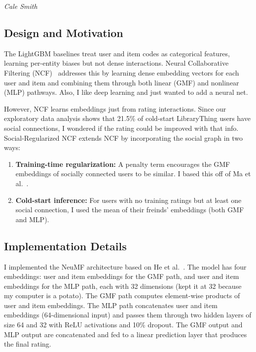 \documentclass[conference]{IEEEtran}
\begin{document}
\textit{Cale Smith}

\subsection{Design and Motivation}

The LightGBM baselines treat user and item codes as categorical features, 
learning per-entity biases but not dense interactions. Neural Collaborative 
Filtering (NCF)~\cite{he2017ncf} addresses this by learning dense embedding 
vectors for each user and item and combining them through both linear (GMF) and 
nonlinear (MLP) pathways. Also, I like deep learning and just wanted to add a
neural net.

However, NCF learns embeddings just from rating interactions. Since our 
exploratory data analysis shows that 21.5\% of cold-start LibraryThing users 
have social connections, I wondered if the rating could be improved with that 
info. Social-Regularized NCF extends NCF by incorporating the social graph in 
two ways:

\begin{enumerate}
  \item \textbf{Training-time regularization:} A penalty term encourages the GMF embeddings of socially connected users to be similar. I based this off of Ma et al.~\cite{ma2011soreg}.
  \item \textbf{Cold-start inference:} For users with no training ratings but at least one social connection, I used the mean of their freinds' embeddings (both GMF and MLP).
\end{enumerate}

\subsection{Implementation Details}

I implemented the NeuMF architecture based on He et al.~\cite{he2017ncf}. The 
model has four embeddings: user and item embeddings for the GMF path, 
and user and item embeddings for the MLP path, each with 32 dimensions (kept it 
at 32 because my computer is a potato). The GMF path computes element-wise 
products of user and item embeddings. The MLP path concatenates user and item 
embeddings (64-dimensional input) and passes them through two hidden layers of 
size 64 and 32 with ReLU activations and 10\% dropout. The GMF output and MLP 
output are concatenated and fed to a linear prediction layer that produces the
final rating.
\end{document}
